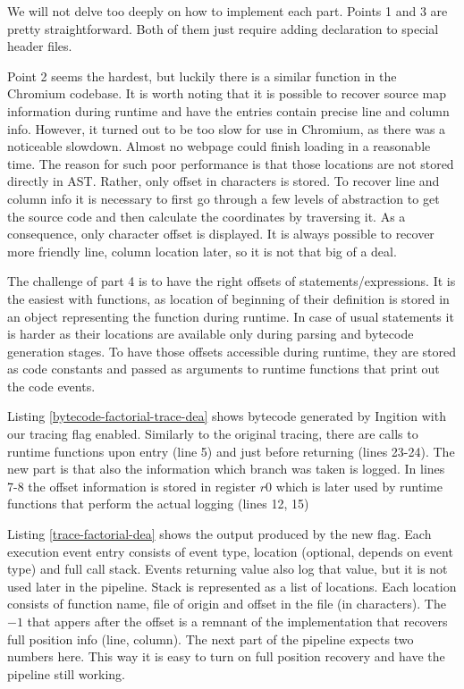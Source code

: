 We will not delve too deeply on how to implement each part.
Points 1 and 3 are pretty straightforward. Both of them just require adding declaration to special header files.

Point 2 seems the hardest, but luckily there is a similar function in the Chromium codebase.
It is worth noting that it is possible to recover source map information during runtime
and have the entries contain precise line and column info. However, it turned out to be too slow
for use in Chromium, as there was a noticeable slowdown. Almost no webpage could finish loading in a reasonable time.
The reason for such poor performance is that those locations are not stored directly in AST. Rather, only offset
in characters is stored. To recover line and column info it is necessary to first go through
a few levels of abstraction to get the source code and then calculate the coordinates by traversing it.
As a consequence, only character offset is displayed. It is always possible to recover more friendly
line, column location later, so it is not that big of a deal.

The challenge of part 4 is to have the right offsets of statements/expressions.
It is the easiest with functions, as location of beginning of their definition is stored in an 
object representing the function during runtime. In case of usual statements it is harder 
as their locations are available only during parsing and bytecode generation stages.
To have those offsets accessible during runtime, they are stored as code constants
and passed as arguments to runtime functions that print out the code events.

Listing \ref{bytecode-factorial-trace-dea} shows bytecode generated by Ingition with
our tracing flag enabled. Similarly to the original tracing, there are calls to runtime functions
upon entry (line 5) and just before returning (lines 23-24). 
The new part is that also the information which branch was taken is logged.
In lines 7-8 the offset information is stored in register $r0$ which is later used by runtime
functions that perform the actual logging (lines 12, 15)


		
Listing \ref{trace-factorial-dea} shows the output produced by the new flag. Each execution event
entry consists of event type, location (optional, depends on event type) and full call stack.
Events returning value also log that value, but it is not used later in the pipeline.
Stack is represented as a list of locations. Each location consists
of function name, file of origin and offset in the file (in characters). The $-1$ that appers after
the offset is a remnant of the implementation that recovers full position info (line, column).
The next part of the pipeline expects two numbers here. This way it is easy to turn on full position recovery
and have the pipeline still working.

